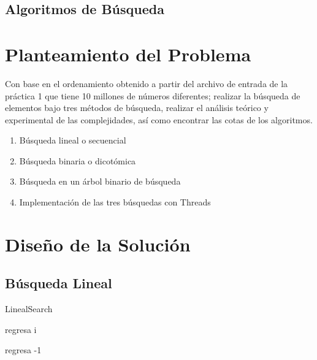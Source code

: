 \documentclass[12pt, fleqn]{article}                             %
\theoremstyle{break}                                            %
\begin{document}
    \subsection{Algoritmos de Búsqueda}




\clearpage
\section{Planteamiento del Problema}


    Con base en el ordenamiento obtenido a partir del archivo de entrada de la práctica
    1 que tiene 10 millones de números diferentes; realizar la búsqueda de elementos
    bajo tres métodos de búsqueda, realizar el análisis teórico y experimental
    de las complejidades, así como encontrar las cotas de los algoritmos.
    
    \begin{enumerate}\setlength\itemsep{0em}
        \item Búsqueda lineal o secuencial
        \item Búsqueda binaria o dicotómica
        \item Búsqueda en un árbol binario de búsqueda
        \item Implementación de las tres búsquedas con Threads
    \end{enumerate}


\clearpage
\section{Diseño de la Solución}

    \subsection{Búsqueda Lineal}
        \begin{algorithm}[H]
        \caption{LinealSearch}
        \begin{algorithmic}[1]
                    \State regresa i
                \EndIf
            \EndFor

            regresa -1
            \EndProcedure
            \end{algorithmic}
        \end{algorithm}
        
\end{document}
